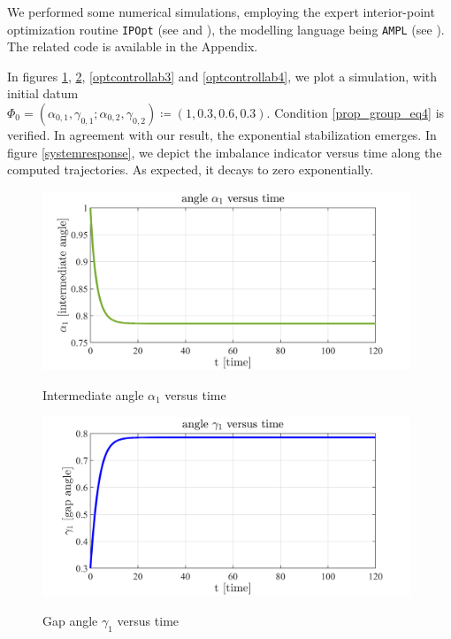 \documentclass{aims}
\theoremstyle{definition}
\begin{document}
	We performed some numerical simulations, employing the expert interior-point optimization routine \verb!IPOpt! (see \cite{IDO} and \cite{waechter2009introduction}), the modelling language being \verb!AMPL! (see \cite{FAP}). The related code is available in the Appendix.
	
	In figures \ref{optcontrollab1}, \ref{optcontrollab2}, \ref{optcontrollab3} and \ref{optcontrollab4}, we plot a simulation, with initial datum\\
	$\Phi_0=\left(\alpha_{0,1},\gamma_{0,1};\alpha_{0,2},\gamma_{0,2}\right)\coloneqq \left(1,0.3,0.6,0.3\right)$. Condition \eqref{prop_group_eq4} is verified. In agreement with our result, the exponential stabilization emerges. In figure \ref{systemresponse}, we depict the imbalance indicator versus time along the computed trajectories. As expected, it decays to zero exponentially.
	
	
	
	\begin{figure}[htp]
		\begin{center}
			\includegraphics[width=11cm]{optstabilalpha1.png}\\
			\caption{Intermediate angle $\alpha_1$ versus time}
			\label{optcontrollab1}
		\end{center}
	\end{figure}
	
	\begin{figure}[htp]
		\begin{center}
			\includegraphics[width=11cm]{optstabilgamma1.png}\\
			\caption{Gap angle $\gamma_1$ versus time}
			\label{optcontrollab2}
		\end{center}
	\end{figure}
	
\end{document}
